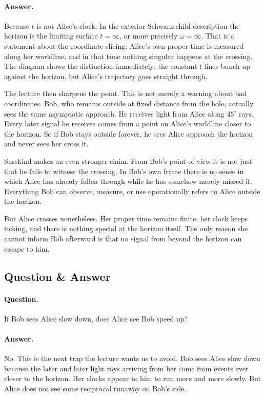 \paragraph{Answer.} Because \(t\) is not Alice's clock. In the exterior Schwarzschild description the horizon is the limiting surface \(t=\infty\), or more precisely \(\omega=\infty\). That is a statement about the coordinate slicing. Alice's own proper time is measured along her worldline, and in that time nothing singular happens at the crossing. The diagram shows the distinction immediately: the constant-\(t\) lines bunch up against the horizon, but Alice's trajectory goes straight through.

The lecture then sharpens the point. This is not merely a warning about bad coordinates. Bob, who remains outside at fixed distance from the hole, actually sees the same asymptotic approach. He receives light from Alice along \(45^\circ\) rays. Every later signal he receives comes from a point on Alice's worldline closer to the horizon. So if Bob stays outside forever, he sees Alice approach the horizon and never sees her cross it.

Susskind makes an even stronger claim. From Bob's point of view it is not just that he fails to witness the crossing. In Bob's own frame there is no sense in which Alice has already fallen through while he has somehow merely missed it. Everything Bob can observe, measure, or use operationally refers to Alice outside the horizon.

But Alice crosses nonetheless. Her proper time remains finite, her clock keeps ticking, and there is nothing special at the horizon itself. The only reason she cannot inform Bob afterward is that no signal from beyond the horizon can escape to him.

\subsection{Question \& Answer}

\paragraph{Question.} If Bob sees Alice slow down, does Alice see Bob speed up?

\paragraph{Answer.} No. This is the next trap the lecture wants us to avoid. Bob sees Alice slow down because the later and later light rays arriving from her come from events ever closer to the horizon. Her clocks appear to him to run more and more slowly. But Alice does not see some reciprocal runaway on Bob's side.


